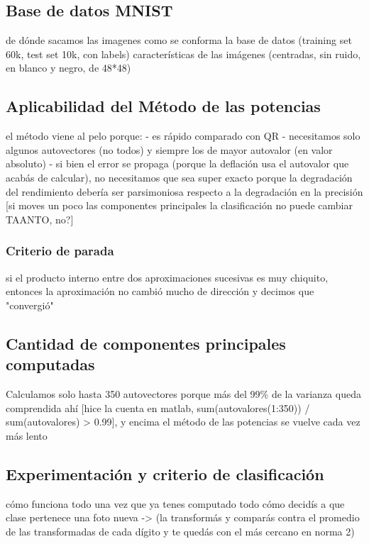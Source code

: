 \subsection{Base de datos MNIST}

de dónde sacamos las imagenes
como se conforma la base de datos (training set 60k, test set 10k, con labels)
características de las imágenes (centradas, sin ruido, en blanco y negro, de 48*48)

\subsection{Aplicabilidad del Método de las potencias}

el método viene al pelo porque:
	- es rápido comparado con QR
	- necesitamos solo algunos autovectores (no todos) y siempre los de mayor autovalor (en valor absoluto)
	- si bien el error se propaga (porque la deflación usa el autovalor que acabás de calcular), no necesitamos que sea super exacto porque la degradación del rendimiento debería ser parsimoniosa respecto a la degradación en la precisión [si moves un poco las componentes principales la clasificación no puede cambiar TAANTO, no?]

\subsubsection{Criterio de parada}

si el producto interno entre dos aproximaciones sucesivas es muy chiquito, entonces la aproximación no cambió mucho de dirección y decimos que "convergió"

\subsection{Cantidad de componentes principales computadas}

Calculamos solo hasta 350 autovectores porque más del 99\% de la varianza queda comprendida ahí [hice la cuenta en matlab, sum(autovalores(1:350)) / sum(autovalores) > 0.99], y encima el método de las potencias se vuelve cada vez más lento

\subsection{Experimentación y criterio de clasificación}

cómo funciona todo una vez que ya tenes computado todo
cómo decidís a que clase pertenece una foto nueva -> (la transformás y comparás contra el promedio de las transformadas de cada dígito y te quedás con el más cercano en norma 2)